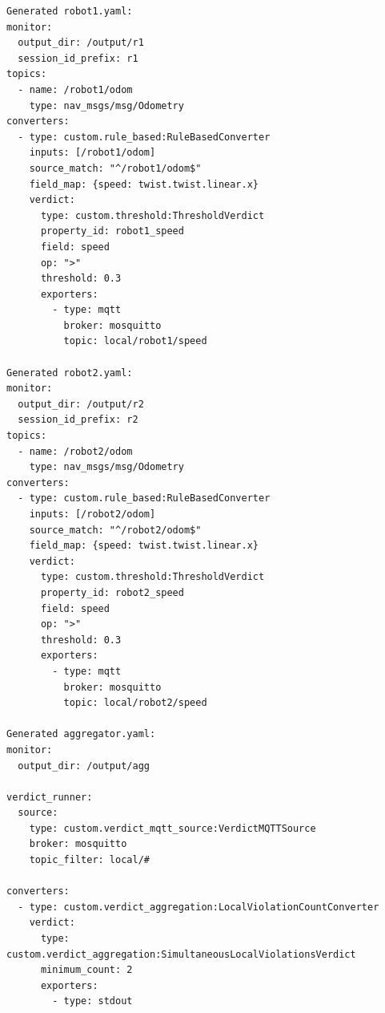 \documentclass[11pt]{article}
\begin{document}
\begin{verbatim}
Generated robot1.yaml:
monitor:
  output_dir: /output/r1
  session_id_prefix: r1
topics:
  - name: /robot1/odom
    type: nav_msgs/msg/Odometry
converters:
  - type: custom.rule_based:RuleBasedConverter
    inputs: [/robot1/odom]
    source_match: "^/robot1/odom$"
    field_map: {speed: twist.twist.linear.x}
    verdict:
      type: custom.threshold:ThresholdVerdict
      property_id: robot1_speed
      field: speed
      op: ">"
      threshold: 0.3
      exporters:
        - type: mqtt
          broker: mosquitto
          topic: local/robot1/speed

Generated robot2.yaml:
monitor:
  output_dir: /output/r2
  session_id_prefix: r2
topics:
  - name: /robot2/odom
    type: nav_msgs/msg/Odometry
converters:
  - type: custom.rule_based:RuleBasedConverter
    inputs: [/robot2/odom]
    source_match: "^/robot2/odom$"
    field_map: {speed: twist.twist.linear.x}
    verdict:
      type: custom.threshold:ThresholdVerdict
      property_id: robot2_speed
      field: speed
      op: ">"
      threshold: 0.3
      exporters:
        - type: mqtt
          broker: mosquitto
          topic: local/robot2/speed

Generated aggregator.yaml:
monitor:
  output_dir: /output/agg

verdict_runner:
  source:
    type: custom.verdict_mqtt_source:VerdictMQTTSource
    broker: mosquitto
    topic_filter: local/#

converters:
  - type: custom.verdict_aggregation:LocalViolationCountConverter
    verdict:
      type: custom.verdict_aggregation:SimultaneousLocalViolationsVerdict
      minimum_count: 2
      exporters:
        - type: stdout
\end{verbatim}
\end{document}
